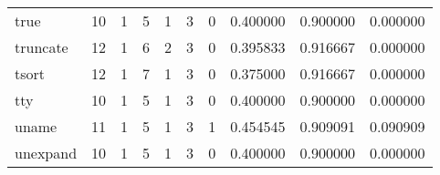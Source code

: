\begin{longtable}{lrrrrrrrrr}
true      &                                       10 &                                                  1 &                                                  5 &                                                  1 &                                                  3 &                                                  0 &                                           0.400000 &                               0.900000 &                             0.000000 \\
truncate  &                                       12 &                                                  1 &                                                  6 &                                                  2 &                                                  3 &                                                  0 &                                           0.395833 &                               0.916667 &                             0.000000 \\
tsort     &                                       12 &                                                  1 &                                                  7 &                                                  1 &                                                  3 &                                                  0 &                                           0.375000 &                               0.916667 &                             0.000000 \\
tty       &                                       10 &                                                  1 &                                                  5 &                                                  1 &                                                  3 &                                                  0 &                                           0.400000 &                               0.900000 &                             0.000000 \\
uname     &                                       11 &                                                  1 &                                                  5 &                                                  1 &                                                  3 &                                                  1 &                                           0.454545 &                               0.909091 &                             0.090909 \\
unexpand  &                                       10 &                                                  1 &                                                  5 &                                                  1 &                                                  3 &                                                  0 &                                           0.400000 &                               0.900000 &                             0.000000 \\

\end{longtable}
